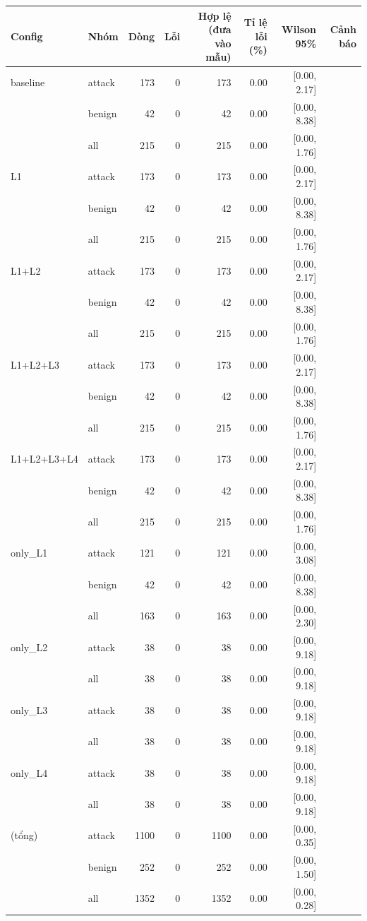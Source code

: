 \begin{tabular}{llrrrrrr}
\toprule
Config & Nhóm & Dòng & Lỗi & Hợp lệ (đưa vào mẫu) & Tỉ lệ lỗi (\%) & Wilson 95\% & Cảnh báo \\
\midrule
baseline & attack & 173 & 0 & 173 & 0.00 & [0.00, 2.17] &  \\
 & benign & 42 & 0 & 42 & 0.00 & [0.00, 8.38] &  \\
 & all & 215 & 0 & 215 & 0.00 & [0.00, 1.76] &  \\
\midrule
L1 & attack & 173 & 0 & 173 & 0.00 & [0.00, 2.17] &  \\
 & benign & 42 & 0 & 42 & 0.00 & [0.00, 8.38] &  \\
 & all & 215 & 0 & 215 & 0.00 & [0.00, 1.76] &  \\
\midrule
L1+L2 & attack & 173 & 0 & 173 & 0.00 & [0.00, 2.17] &  \\
 & benign & 42 & 0 & 42 & 0.00 & [0.00, 8.38] &  \\
 & all & 215 & 0 & 215 & 0.00 & [0.00, 1.76] &  \\
\midrule
L1+L2+L3 & attack & 173 & 0 & 173 & 0.00 & [0.00, 2.17] &  \\
 & benign & 42 & 0 & 42 & 0.00 & [0.00, 8.38] &  \\
 & all & 215 & 0 & 215 & 0.00 & [0.00, 1.76] &  \\
\midrule
L1+L2+L3+L4 & attack & 173 & 0 & 173 & 0.00 & [0.00, 2.17] &  \\
 & benign & 42 & 0 & 42 & 0.00 & [0.00, 8.38] &  \\
 & all & 215 & 0 & 215 & 0.00 & [0.00, 1.76] &  \\
\midrule
only\_L1 & attack & 121 & 0 & 121 & 0.00 & [0.00, 3.08] &  \\
 & benign & 42 & 0 & 42 & 0.00 & [0.00, 8.38] &  \\
 & all & 163 & 0 & 163 & 0.00 & [0.00, 2.30] &  \\
\midrule
only\_L2 & attack & 38 & 0 & 38 & 0.00 & [0.00, 9.18] &  \\
 & all & 38 & 0 & 38 & 0.00 & [0.00, 9.18] &  \\
\midrule
only\_L3 & attack & 38 & 0 & 38 & 0.00 & [0.00, 9.18] &  \\
 & all & 38 & 0 & 38 & 0.00 & [0.00, 9.18] &  \\
\midrule
only\_L4 & attack & 38 & 0 & 38 & 0.00 & [0.00, 9.18] &  \\
 & all & 38 & 0 & 38 & 0.00 & [0.00, 9.18] &  \\
\midrule
(tổng) & attack & 1100 & 0 & 1100 & 0.00 & [0.00, 0.35] &  \\
 & benign & 252 & 0 & 252 & 0.00 & [0.00, 1.50] &  \\
 & all & 1352 & 0 & 1352 & 0.00 & [0.00, 0.28] &  \\
\bottomrule
\end{tabular}
